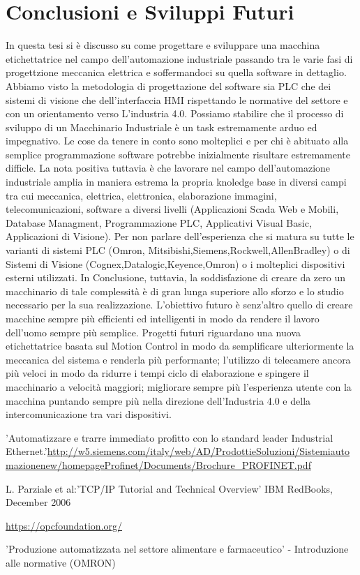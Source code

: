 \documentclass[12pt, a4paper, oneside]{book}
\begin{document}
\chapter{Conclusioni e Sviluppi Futuri}
In questa tesi si è discusso su come progettare e sviluppare una macchina etichettatrice nel campo dell'automazione industriale passando tra le varie fasi di progettzione meccanica elettrica e soffermandoci su quella software in dettaglio. Abbiamo visto la metodologia di progettazione del software sia PLC che dei sistemi di visione che dell'interfaccia HMI rispettando le normative del settore e con un orientamento verso L'industria 4.0. 
Possiamo stabilire che il processo di sviluppo di un Macchinario Industriale è un task estremamente arduo ed impegnativo. Le cose da tenere in conto sono molteplici e per chi è abituato alla semplice programmazione software potrebbe inizialmente risultare estremamente difficle. La nota positiva tuttavia è che lavorare nel campo dell'automazione industriale amplia in maniera estrema la propria knoledge base in diversi campi tra cui meccanica, elettrica, elettronica, elaborazione immagini, telecomunicazioni, software a diversi livelli (Applicazioni Scada Web e Mobili, Database Managment, Programmazione PLC, Applicativi Visual Basic, Applicazioni di Visione).
Per non parlare dell'esperienza che si matura su tutte le varianti di sistemi PLC (Omron, Mitsibishi,Siemens,Rockwell,AllenBradley) o di Sistemi di Visione (Cognex,Datalogic,Keyence,Omron) o i molteplici dispositivi esterni utilizzati.
In Conclusione, tuttavia, la soddisfazione di creare da zero un macchinario di tale complessità è di gran lunga superiore allo sforzo e lo studio necessario per la sua realizzazione.
L'obiettivo futuro è senz'altro quello di creare macchine sempre più efficienti ed intelligenti in modo da rendere il lavoro dell'uomo sempre più semplice. Progetti futuri riguardano una nuova etichettatrice basata sul Motion Control in modo da semplificare ulteriormente la meccanica del sistema e renderla più performante; l'utilizzo di telecamere ancora più veloci in modo da ridurre i tempi ciclo di elaborazione e spingere il macchinario a velocità maggiori; migliorare sempre più l'esperienza utente con la macchina puntando sempre più nella direzione dell'Industria 4.0 e della intercomunicazione tra vari dispositivi.



\newpage
\begin{thebibliography}{100}
	'Automatizzare e trarre immediato profitto con lo standard leader Industrial Ethernet.'\url{http://w5.siemens.com/italy/web/AD/ProdottieSoluzioni/Sistemiautomazionenew/homepageProfinet/Documents/Brochure_PROFINET.pdf}	
	
	L. Parziale et al:'TCP/IP Tutorial and Technical Overview' IBM RedBooks, December 2006
	
	\url{https://opcfoundation.org/}
	
	'Produzione automatizzata nel settore alimentare e farmaceutico' - Introduzione alle normative (OMRON)
	
	

	
\end{thebibliography}
\end{document}
